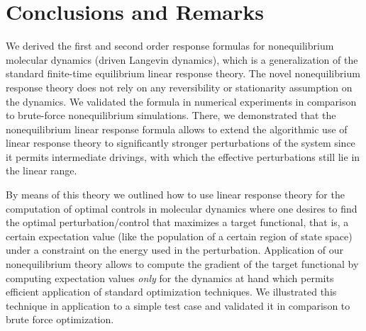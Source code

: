 \documentclass[]{tMPH2e}
\begin{document}
 





\section{Conclusions and Remarks}


{
  We derived the first and second order
  response formulas for nonequilibrium molecular
dynamics (driven Langevin dynamics), which is a generalization of the
standard finite-time equilibrium linear response theory.
The novel nonequilibrium response theory
does not rely on any reversibility or stationarity assumption on the dynamics.
We validated the formula in numerical
experiments in comparison to brute-force nonequilibrium
simulations. There, we demonstrated that the nonequilibrium linear
response formula allows to extend the algorithmic use of linear
response theory to significantly stronger perturbations of the system
since it permits intermediate drivings, with which the effective perturbations
still lie in the linear range.
}

By means of this theory we outlined how to use linear response theory for the computation of optimal controls in molecular dynamics where one desires to find the optimal perturbation/control that maximizes a target functional, that is, a certain expectation value (like the population of a certain region of state space) under a constraint on the energy used in the perturbation. Application of our nonequilibrium theory allows to compute the gradient of the target functional by computing expectation values \emph{only} for the dynamics at hand which permits efficient application of standard optimization techniques. We illustrated this technique in application to a simple test case and validated it in comparison to brute force optimization.  













\end{document}
